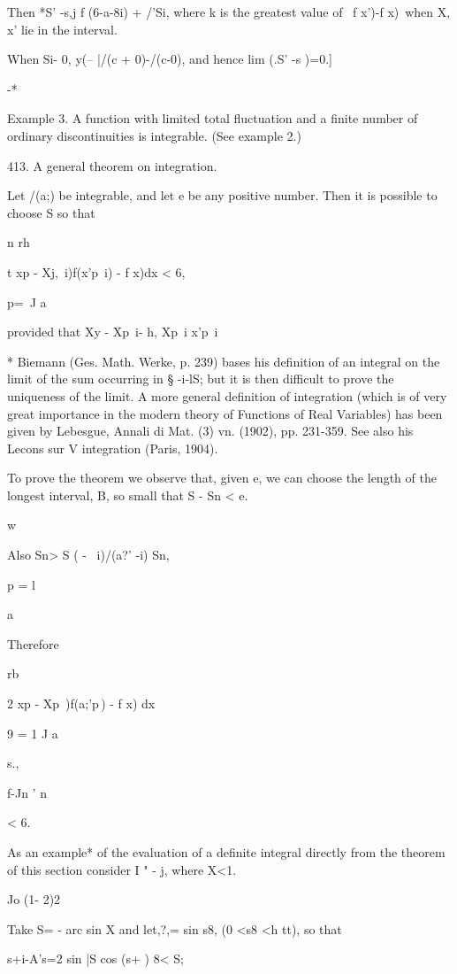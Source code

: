 Then *S' -s,j f (6-a-8i) + /'Si, where k is the greatest value of \ f
x')-f x)\, when X, x' lie in the interval.

When Si- 0, y(-- |/(c + 0)-/(c-0), and hence lim (.S' -s )=0.]

 -*

Example 3. A function with limited total fluctuation and a finite
number of ordinary discontinuities is integrable. (See example
2.)

413. A general theorem on integration.

Let /(a;) be integrable, and let e be any positive number. Then it is
possible to choose S so that

n rh

t xp - Xj,\ i)f(x'p\ i) - f x)dx < 6,

p=\ J a

provided that Xy - Xp\ i- h, Xp\ i x'p\ i%

* Biemann (Ges. Math. Werke, p. 239) bases his definition of an
integral on the limit of the sum occurring in § -i-lS; but it is then
difficult to prove the uniqueness of the limit. A more general
definition of integration (which is of very great importance in the
modern theory of Functions of Real Variables) has been given by
Lebesgue, Annali di Mat. (3) vn. (1902), pp. 231-359. See also his
Lecons sur V integration (Paris, 1904).

%
%

To prove the theorem we observe that, given e, we can choose the
length of the longest interval, B, so small that S - Sn < e.

w

Also Sn> S ( - \ i)/(a?' -i) Sn,

p = l

  a

Therefore

  rb

2 xp - Xp\ )f(a;'p\,) - f x) dx

9 = 1 J a

 s.,

  f-Jn ' n

< 6.

As an example* of the evaluation of a definite integral directly from
the theorem of this section consider I " - j, where X<1.

Jo (1- 2)2

Take S= - arc sin X and let,?,= sin s8, (0 <s8 <h tt), so that

 s+i-A's=2 sin |S cos (s+ ) 8< S;

